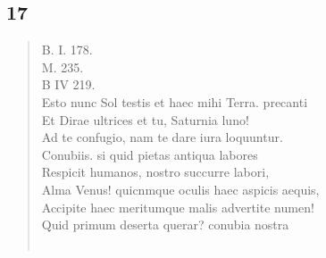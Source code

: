 \documentclass[11pt, a4paper]{report}
\begin{document}
            \subsection*{17}
      \begin{verse}
      B. I. 178. \\ M. 235. \\ B IV 219. \\ Esto nunc Sol testis et haec mihi Terra. precanti \\ Et Dirae ultrices et tu, Saturnia luno! \\ Ad te confugio, nam te dare iura loquuntur. \\ Conubiis. si quid pietas antiqua labores \\ Respicit humanos, nostro succurre labori, \\ Alma Venus! quicnmque oculis haec aspicis aequis, \\ Accipite haec meritumque malis advertite numen! \\ Quid primum deserta querar? conubia nostra \\ 
        ﻿\pagebreak 

\end{verse}
\end{document}
